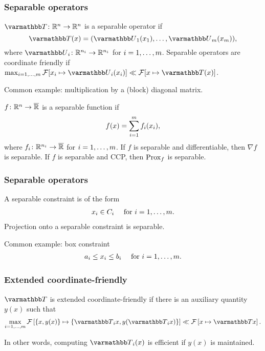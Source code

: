 \documentclass[10pt,mathserif]{beamer}
\begin{document}

\begin{frame}
\frametitle{Separable operators}
$\opT\colon\reals^n\rightarrow \reals^n$ is a separable operator if
\[
\opT(x)=(\opU_1(x_1),\dots,\opU_m(x_m)),
\]
where $\opU_i\colon\reals^{n_i}\rightarrow\reals^{n_i}$ for $i=1,\dots,m$.
Separable operators are coordinate friendly if $\max_{i=1,\dots,m}\mathcal{F}[x_i\mapsto \opU_i(x_i)]\ll\mathcal{F}[x\mapsto \opT(x)]$.

\vspace{0.2in}
Common example: multiplication by a (block) diagonal matrix.

\vspace{0.2in}
$f\colon\mathbb{R}^n\rightarrow \overline{\mathbb{R}}$ is a separable function if
\begin{align*}
  f(x)  = \sum_{i=1}^{m} f_i(x_i),
\end{align*}
where $f_i\colon\mathbb{R}^{n_i}\rightarrow \overline{\mathbb{R}}$ for $i=1,\dots,m$.
If $f$ is separable and differentiable, then $\nabla f$ is separable.
If $f$ is separable and CCP, then $\mathrm{Prox}_{f}$ is separable.

\end{frame}




\begin{frame}
\frametitle{Separable operators}
A separable constraint is of the form
\begin{align*}
x_i\in C_i\quad
\text{ for }
  i=1,\dots,m.
\end{align*}
Projection onto a separable constraint is separable.

\vspace{0.2in}

Common example: box constraint
\begin{align*}
  a_i\le x_i \le b_i \quad
\text{ for }i=1,\dots,m.
\end{align*}
\end{frame}



\begin{frame}
\frametitle{Extended coordinate-friendly}
$\opT$ is extended coordinate-friendly if there is an auxiliary quantity $y(x)$ such that
\begin{align*}
    \max_{i=1,\dots,m}\cF\left[\{x,y(x)\}\mapsto \{\opT_ix, y(\opT_i x)\}\right] \ll\cF\left[x\mapsto \opT x\right].
\end{align*}

In other words, computing $\opT_i(x)$ is efficient if $y(x)$ is maintained.
\end{frame}
\end{document}
